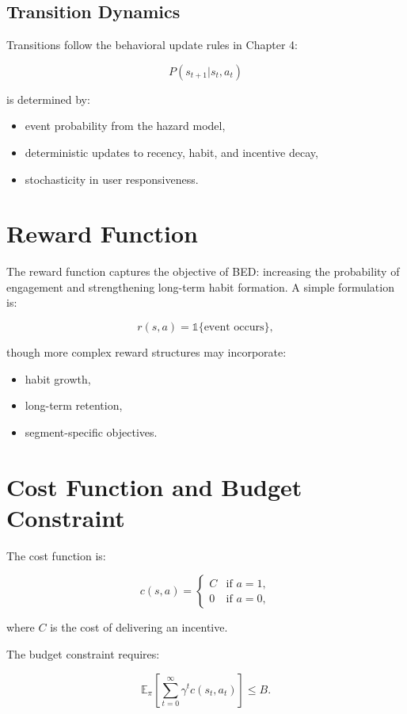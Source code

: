 \subsection{Transition Dynamics}

Transitions follow the behavioral update rules in Chapter 4:


\[
P(s_{t+1} | s_t, a_t)
\]


is determined by:
\begin{itemize}
    \item event probability from the hazard model,
    \item deterministic updates to recency, habit, and incentive decay,
    \item stochasticity in user responsiveness.
\end{itemize}

\section{Reward Function}

The reward function captures the objective of BED: increasing the probability of
engagement and strengthening long-term habit formation. A simple formulation is:


\[
r(s,a) = \mathbb{1}\{\text{event occurs}\},
\]


though more complex reward structures may incorporate:

\begin{itemize}
    \item habit growth,
    \item long-term retention,
    \item segment-specific objectives.
\end{itemize}

\section{Cost Function and Budget Constraint}

The cost function is:


\[
c(s,a) =
\begin{cases}
C & \text{if } a = 1, \\
0 & \text{if } a = 0,
\end{cases}
\]


where $C$ is the cost of delivering an incentive.

The budget constraint requires:


\[
\mathbb{E}_{\pi} \left[ \sum_{t=0}^{\infty} \gamma^t c(s_t, a_t) \right] \le B.
\]



